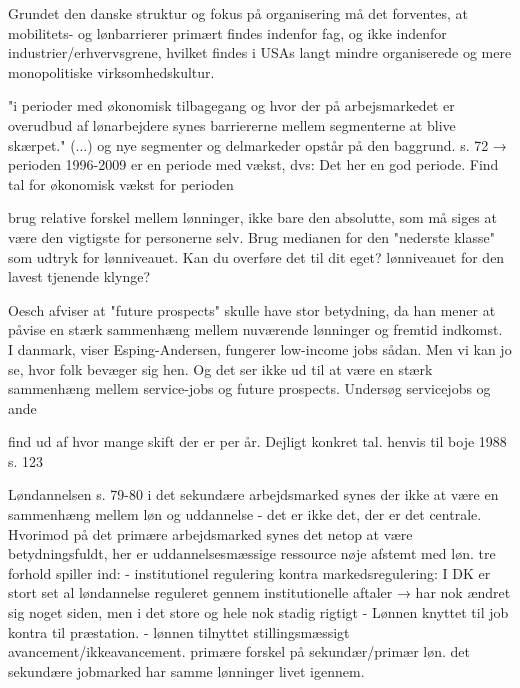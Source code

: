 Grundet den danske struktur og fokus på organisering må det forventes, at mobilitets- og lønbarrierer primært findes indenfor fag, og ikke indenfor industrier/erhvervsgrene, hvilket findes i USAs langt mindre organiserede og mere monopolitiske virksomhedskultur. 

"i perioder med økonomisk tilbagegang og hvor der på arbejsmarkedet er overudbud af lønarbejdere synes barriererne mellem segmenterne at blive skærpet." (...) og nye segmenter og delmarkeder opstår på den baggrund. s. 72
→ perioden 1996-2009 er en periode med vækst, dvs: Det her en god periode. Find tal for økonomisk vækst for perioden


brug relative forskel mellem lønninger, ikke bare den absolutte, som må siges at være den vigtigste for personerne selv. Brug medianen for den "nederste klasse" som udtryk for lønniveauet. Kan du overføre det til dit eget? lønniveauet for den lavest tjenende klynge?

Oesch afviser at "future prospects" skulle have stor betydning, da han mener at påvise en stærk sammenhæng mellem nuværende lønninger og fremtid indkomst. I danmark, viser Esping-Andersen, fungerer low-income jobs sådan. Men vi kan jo se, hvor folk bevæger sig hen. Og det ser ikke ud til at være en stærk sammenhæng mellem service-jobs og future prospects. Undersøg servicejobs og ande


find ud af hvor mange skift der er per år. Dejligt konkret tal. henvis til boje 1988 s. 123


Løndannelsen s. 79-80
	i det sekundære arbejdsmarked synes der ikke at være en sammenhæng mellem løn og uddannelse - det er ikke det, der er det centrale. Hvorimod på det primære arbejdsmarked synes det netop at være betydningsfuldt, her er uddannelsesmæssige ressource nøje afstemt med løn. 
	tre forhold spiller ind:
	- institutionel regulering kontra markedsregulering: I DK er stort set al løndannelse reguleret gennem institutionelle aftaler 
	→ har nok ændret sig noget siden, men i det store og hele nok stadig rigtigt
	- Lønnen knyttet til job kontra til præstation.
	- lønnen tilnyttet stillingsmæssigt avancement/ikkeavancement. primære forskel på sekundær/primær løn. det sekundære jobmarked har samme lønninger livet igennem. 






















